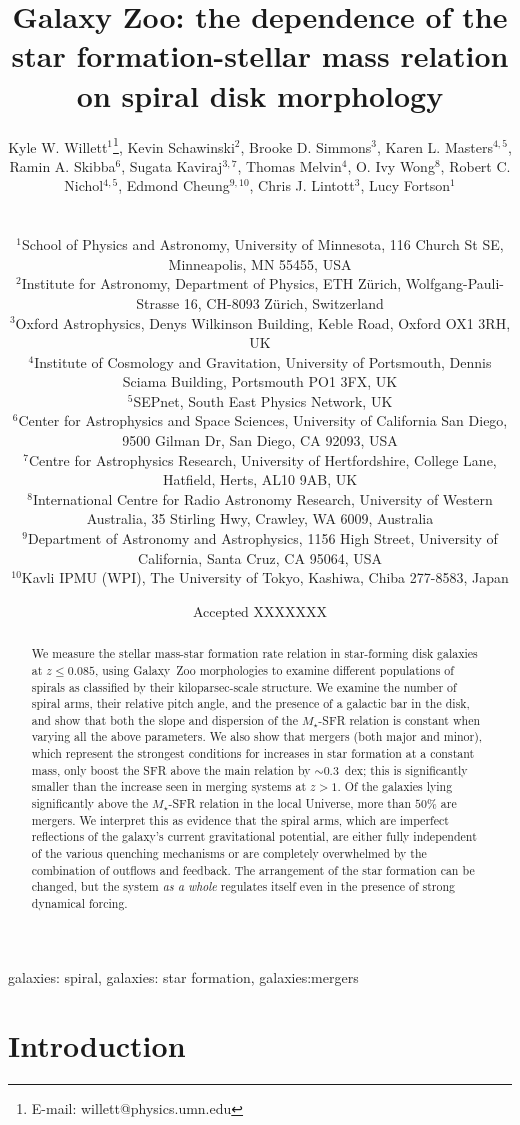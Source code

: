 \documentclass[useAMS,usenatbib]{mn2e}
\title[Disk galaxy morphology and the star-forming main sequence]{Galaxy Zoo: the dependence of the star formation-stellar mass relation on spiral disk morphology}
\author[Willett et al.]{
  \parbox[t]{16cm}{
  Kyle W. Willett$^{1}$\thanks{E-mail: willett@physics.umn.edu},
  Kevin Schawinski$^{2}$,
  Brooke D. Simmons$^{3}$,
  Karen L. Masters$^{4,5}$,
  Ramin A. Skibba$^{6}$,
  Sugata Kaviraj$^{3,7}$,
  Thomas Melvin$^{4}$,
  O. Ivy Wong$^{8}$,
  Robert C. Nichol$^{4,5}$,
  Edmond Cheung$^{9,10}$,
  Chris J. Lintott$^{3}$,
  Lucy Fortson$^{1}$
  \\
  }\\
$^{1}$School of Physics and Astronomy, University of Minnesota, 116 Church St SE, Minneapolis, MN 55455, USA \\
$^{2}$Institute for Astronomy, Department of Physics, ETH Z\"urich, Wolfgang-Pauli-Strasse 16, CH-8093 Z\"urich, Switzerland \\
$^{3}$Oxford Astrophysics, Denys Wilkinson Building, Keble Road, Oxford OX1 3RH, UK \\
$^{4}$Institute of Cosmology and Gravitation, University of Portsmouth, Dennis Sciama Building, Portsmouth PO1 3FX, UK \\
$^{5}$SEPnet, South East Physics Network, UK \\
$^{6}$Center for Astrophysics and Space Sciences, University of California San Diego, 9500 Gilman Dr, San Diego, CA 92093, USA \\
$^{7}$Centre for Astrophysics Research, University of Hertfordshire, College Lane, Hatfield, Herts, AL10 9AB, UK \\
$^{8}$International Centre for Radio Astronomy Research, University of Western Australia, 35 Stirling Hwy, Crawley, WA 6009, Australia \\
$^{9}$Department of Astronomy and Astrophysics, 1156 High Street, University of California, Santa Cruz, CA 95064, USA\\
$^{10}$Kavli IPMU (WPI), The University of Tokyo, Kashiwa, Chiba 277-8583, Japan\\
}
\def\rr{\color{titlecol}}
\begin{document}
\date{Accepted XXXXXXX}
\pagerange{\pageref{firstpage}--\pageref{lastpage}} 
\maketitle
\label{firstpage}



\begin{abstract}
We measure the {\rr stellar mass-star formation rate relation in star-forming disk galaxies at $z\le0.085$, using Galaxy~Zoo morphologies to examine different populations of spirals as classified by their kiloparsec-scale structure. We examine the number of spiral arms, their relative} pitch angle, and the presence of a galactic bar in the disk, and show that both the slope and dispersion of the $M_\star$-SFR relation is constant when varying all the above parameters. We also show that mergers (both major and minor), which represent the strongest conditions for increases in star formation at a constant mass, only boost the SFR above the main relation by $\sim0.3$~dex; this is significantly smaller than the increase seen in merging systems at $z>1$. Of the galaxies lying significantly above the $M_\star$-SFR relation in the local Universe, more than $50\%$ are mergers. We interpret this as evidence that the spiral arms, which are imperfect reflections of the galaxy's current gravitational potential, are either fully independent of the various quenching mechanisms or are completely overwhelmed by the combination of outflows and feedback. The arrangement of the star formation can be changed, but the system \emph{as a whole} regulates itself even in the presence of strong dynamical forcing. 
\end{abstract}

\begin{keywords}
galaxies: spiral, galaxies: star formation, galaxies:mergers
\end{keywords}


\section{Introduction} \label{sec-intro}
\end{document}
